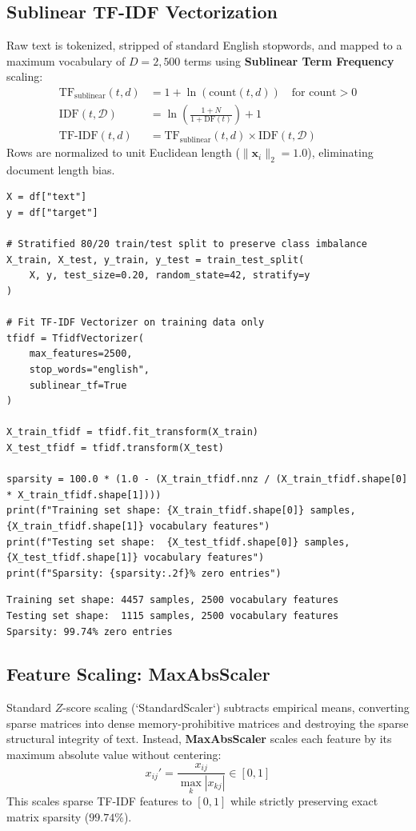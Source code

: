 \documentclass[12pt]{article}
\begin{document}
\subsection{Sublinear TF-IDF Vectorization}
Raw text is tokenized, stripped of standard English stopwords, and mapped to a maximum vocabulary of $D = 2,500$ terms using \textbf{Sublinear Term Frequency} scaling:
\begin{align}
    \text{TF}_{\text{sublinear}}(t, d) &= 1 + \ln(\text{count}(t, d)) \quad \text{for } \text{count} > 0 \\
    \text{IDF}(t, \mathcal{D}) &= \ln\left( \frac{1 + N}{1 + \text{DF}(t)} \right) + 1 \\
    \text{TF-IDF}(t, d) &= \text{TF}_{\text{sublinear}}(t, d) \times \text{IDF}(t, \mathcal{D})
\end{align}
Rows are normalized to unit Euclidean length ($\|\mathbf{x}_i\|_2 = 1.0$), eliminating document length bias.

\begin{lstlisting}[style=code]
X = df["text"]
y = df["target"]

# Stratified 80/20 train/test split to preserve class imbalance
X_train, X_test, y_train, y_test = train_test_split(
    X, y, test_size=0.20, random_state=42, stratify=y
)

# Fit TF-IDF Vectorizer on training data only
tfidf = TfidfVectorizer(
    max_features=2500,
    stop_words="english",
    sublinear_tf=True
)

X_train_tfidf = tfidf.fit_transform(X_train)
X_test_tfidf = tfidf.transform(X_test)

sparsity = 100.0 * (1.0 - (X_train_tfidf.nnz / (X_train_tfidf.shape[0] * X_train_tfidf.shape[1])))
print(f"Training set shape: {X_train_tfidf.shape[0]} samples, {X_train_tfidf.shape[1]} vocabulary features")
print(f"Testing set shape:  {X_test_tfidf.shape[0]} samples, {X_test_tfidf.shape[1]} vocabulary features")
print(f"Sparsity: {sparsity:.2f}% zero entries")
\end{lstlisting}

\begin{lstlisting}[style=output]
Training set shape: 4457 samples, 2500 vocabulary features
Testing set shape:  1115 samples, 2500 vocabulary features
Sparsity: 99.74% zero entries
\end{lstlisting}

\subsection{Feature Scaling: MaxAbsScaler}
Standard $Z$-score scaling (`StandardScaler`) subtracts empirical means, converting sparse matrices into dense memory-prohibitive matrices and destroying the sparse structural integrity of text. Instead, \textbf{MaxAbsScaler} scales each feature by its maximum absolute value without centering:
\begin{equation}
    x_{ij}' = \frac{x_{ij}}{\max_k |x_{kj}|} \in [0, 1]
\end{equation}
This scales sparse TF-IDF features to $[0, 1]$ while strictly preserving exact matrix sparsity ($99.74\%$).
\end{document}
